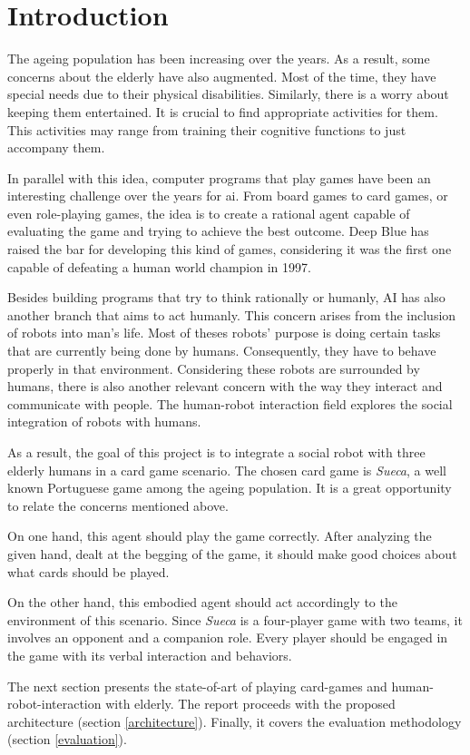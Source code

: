 \section{Introduction} \label{introduction}

The ageing population has been increasing over the years.
As a result, some concerns about the elderly have also augmented.
Most of the time, they have special needs due to their physical disabilities.
Similarly, there is a worry about keeping them entertained.
It is crucial to find appropriate activities for them.
This activities may range from training their cognitive functions to just accompany them.

In parallel with this idea, computer programs that play games have been an interesting challenge over the years for \gls{ai}.
From board games to card games, or even role-playing games, the idea is to create a rational agent capable of evaluating the game and trying to achieve the best outcome.
Deep Blue has raised the bar for developing this kind of games, considering it was the first one capable of defeating a human world champion in 1997.

Besides building programs that try to think rationally or humanly, AI has also another branch that aims to act humanly.
This concern arises from the inclusion of robots into man's life.
Most of theses robots' purpose is doing certain tasks that are currently being done by humans.
Consequently, they have to behave properly in that environment.
Considering these robots are surrounded by humans, there is also another relevant concern with the way they interact and communicate with people.
The human-robot interaction field explores the social integration of robots with humans.

As a result, the goal of this project is to integrate a social robot with three elderly humans in a card game scenario.
The chosen card game is \emph{Sueca}, a well known Portuguese game among the ageing population.
It is a great opportunity to relate the concerns mentioned above.

On one hand, this agent should play the game correctly.
After analyzing the given hand, dealt at the begging of the game, it should make good choices about what cards should be played.

On the other hand, this embodied agent should act accordingly to the environment of this scenario.
Since \emph{Sueca} is a four-player game with two teams, it involves an opponent and a companion role.
Every player should be engaged in the game with its verbal interaction and behaviors.


The next section presents the state-of-art of playing card-games and human-robot-interaction with elderly.
The report proceeds with the proposed architecture (section \ref{architecture}).
Finally, it covers the evaluation methodology (section \ref{evaluation}). 
